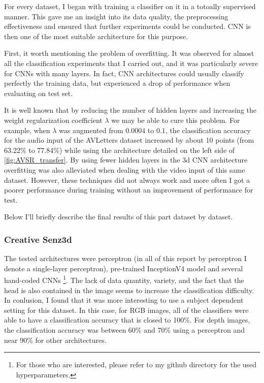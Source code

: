 For every dataset, I began with training a classifier on it in a
totoally supervised manner.
This gave me an insight into its data quality, the preprocessing
effectiveness and ensured that further experiments could be conducted.
CNN is then one of the most suitable architecture for this purpose.

First, it worth mentioning the problem of overfitting.
It was observed for almost all the classification experiments that I
carried out, and it was particularly severe for CNNs with many layers.
In fact, CNN architectures could usually classify
perfectly the training data, but experienced a drop of performance
when evaluating on test set.

It is well known that by reducing the number of hidden layers and
increasing the weight regularization coefficient $\lambda$ we may
be able to cure this problem.
For example, when $\lambda$ was augmented from $0.0004$ to $0.1$,
the classification accuracy for the audio input of the AVLetters
dataset increased by about 10 points
(from 63.22\% to 77.84\%) while using the architecture detailed on
the left side of \autoref{fig:AVSR_transfer}.
By using fewer hidden layers in the 3d CNN architecture overfitting
was also alleviated when dealing with the video input of this same dataset.
However, these techniques did not always work
and more often I got a poorer performance during training without
an improvement of performance for test.

Below I'll briefly describe the final results of this part dataset by
dataset.

\subsubsection{Creative Senz3d}

The tested architectures were perceptron (in all of this report by
perceptron I denote a single-layer perceptron), pre-trained InceptionV4
model \cite{C. Szegedy 2017} and several hand-coded CNNs%
\footnote{For those who are interested, please refer to my github
directory for the used hyperparameters.}.
The lack of data quantity, variety, and the fact that the head is also
contained in the image seems to increase the classification difficulty.
In conlusion, I found that it was more interesting to use a subject
dependent setting for this dataset. In this case, for RGB images,
all of the classifiers were able to have a classification accuracy that is
closed to 100\%. For depth images, the classification accuracy was
between 60\% and 70\% using a perceptron and near 90\% for other
architectures.

